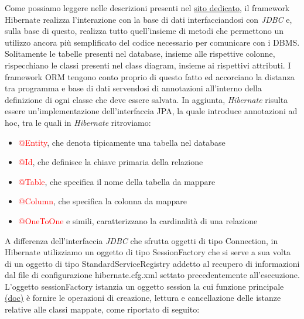 \documentclass[12pt,a4paper,onecolumn,x11names]{article}
\begin{document}
	\begin{flushleft}
		Come possiamo leggere nelle descrizioni presenti nel \textsf{\href{http://hibernate.org/orm/}{sito dedicato}}, il framework Hibernate realizza l'interazione con la base di dati interfacciandosi con \textit{JDBC} e, sulla base di questo, realizza tutto quell'insieme di metodi che permettono un utilizzo ancora più semplificato del codice necessario per comunicare con i DBMS. Solitamente le tabelle presenti nel database, insieme alle rispettive colonne, rispecchiano le classi presenti nel class diagram, insieme ai rispettivi attributi. I framework ORM tengono conto proprio di questo fatto ed accorciano la distanza tra programma e base di dati servendosi di annotazioni all'interno della definizione di ogni classe che deve essere salvata. In aggiunta, \textit{Hibernate} risulta essere un'implementazione dell'interfaccia JPA, la quale introduce annotazioni ad hoc, tra le quali in \textit{Hibernate} ritroviamo:
		\begin{itemize}
			\item \textcolor{red}{\textsf{@Entity}}, che denota tipicamente una tabella nel database
			\item \textcolor{red}{\textsf{@Id}}, che definisce la chiave primaria della relazione
			\item \textcolor{red}{\textsf{@Table}}, che specifica il nome della tabella da mappare
			\item \textcolor{red}{\textsf{@Column}}, che specifica la colonna da mappare
			\item \textcolor{red}{\textsf{@OneToOne}} e simili, caratterizzano la cardinalità di una relazione
		\end{itemize}
		\begin{flushleft}
			A differenza dell'interfaccia \textit{JDBC} che sfrutta oggetti di tipo \textsf{Connection}, in Hibernate utilizziamo un oggetto di tipo \textsf{SessionFactory} che si serve a sua volta di un oggetto di tipo \textsf{StandardServiceRegistry} addetto al recupero di informazioni dal file di configurazione \textsf{hibernate.cfg.xml} settato precedentemente all'esecuzione. L'oggetto \textsf{sessionFactory} istanzia un oggetto \textsf{session} la cui funzione principale \textsf{\href{http://docs.jboss.org/hibernate/orm/3.5/javadocs/org/hibernate/Session.html}{(doc)}} è fornire le operazioni di creazione, lettura e cancellazione delle istanze relative alle classi mappate, come riportato di seguito:
		\end{flushleft}
		\begin{lstlisting}[language=java, caption=Utilizzo di SessionFactory]

\end{lstlisting}
\end{flushleft}
\end{document}
